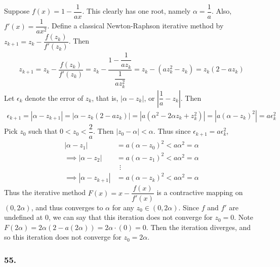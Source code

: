 \documentclass[12pt]{article}
\begin{document}
\noindent Suppose $f(x) = 1 - \dfrac{1}{ax}$.  This clearly has one root, namely $\alpha = \dfrac{1}{a}$.  Also, $f'(x) = \dfrac{1}{ax^2}$.  Define a classical Newton-Raphson iterative method by $z_{k+1} = z_k - \dfrac{f(z_k)}{f'(z_k)}$.  Then
\begin{align*}
z_{k+1} = z_k - \dfrac{f(z_k)}{f'(z_k)} = z_k - \dfrac{1 - \dfrac{1}{az_k}}{\dfrac{1}{az_k^2}} = z_k - (az_k^2 - z_k) = z_k(2 - az_k)
\end{align*}
Let $\epsilon_k$ denote the error of $z_k$, that is, $|\alpha - z_k|$, or $\left|\dfrac{1}{a} - z_k\right|$.  Then
\begin{align*}
\epsilon_{k+1} = |\alpha - z_{k+1}| = |\alpha - z_k(2 - az_k)| = |a(\alpha^2 - 2\alpha z_k + z_k^2)| = |a(\alpha - z_k)^2| = a\epsilon_k^2
\end{align*}
Pick $z_0$ such that $0 < z_0 < \dfrac{2}{a}$.  Then $|z_0 - \alpha| < \alpha$.  Thus since $\epsilon_{k+1} = a\epsilon_k^2$,
\begin{align*}
|\alpha - z_1| &= a(\alpha - z_0)^2 < a\alpha^2 = \alpha \\
\implies |\alpha - z_2| &= a(\alpha - z_1)^2 < a\alpha^2 = \alpha \\
&\ \ \vdots \\
\implies |\alpha - z_{k+1}| &= a(\alpha - z_k)^2 < a\alpha^2 = \alpha 
\end{align*}
Thus the iterative method $F(x) = x - \dfrac{f(x)}{f'(x)}$ is a contractive mapping on $(0, 2\alpha)$, and thus converges to $\alpha$ for any $z_0 \in (0, 2\alpha)$.  Since $f$ and $f'$ are undefined at $0$, we can say that this iteration does not converge for $z_0 = 0$.  Note $F(2\alpha) = 2\alpha(2 - a(2\alpha)) = 2\alpha\cdot(0) = 0$.  Then the iteration diverges, and so this iteration does not converge for $z_0 = 2\alpha$.

\subsubsection*{55.}
\end{document}
